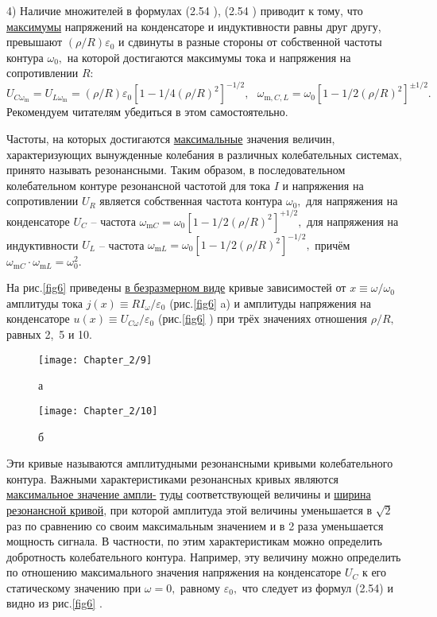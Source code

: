 {4) Наличие множителей   в формулах (2.54 ), (2.54 ) приводит к тому, что \underline{максимумы} напряжений на конденсаторе и индуктивности равны друг другу, превышают $(\rho/R)\varepsilon_0$ и сдви\-нуты в разные стороны от собственной частоты контура $\omega_0,$ на которой достигаются максиму\-мы тока и напряжения на сопротивлении $R:$
{\large
\begin{equation}\label{2.57}
	U_{C\omega_\text{m}}=U_{L\omega_\text{m}}=(\rho/R)\varepsilon_0[1-1/4(\rho/R)^2]^{-1/2},~~~\omega_{\text{m},C,L}=\omega_0[1-1/2(\rho/R)^2]^{\pm1/2}.
\end{equation}}
Рекомендуем читателям убедиться в этом самостоятельно.

Частоты, на которых достигаются \underline{максимальные} значения величин, характеризующих выну\-жденные колебания в различных колебательных системах, принято называть \textsf{резонансными.} Таким образом, в последовательном колебательном контуре резонансной частотой для тока $I$ и напряжения на сопротивлении $U_R$ является собственная частота контура $\omega_0,$ для напряжения на конденсаторе $U_C$ – частота $\omega_{\text{m}C}=\omega_0[1-1/2(\rho/R)^2]^{+1/2},$ для напряжения на индуктивности $U_L$ – частота $\omega_{\text{m}L}=\omega_0[1-1/2(\rho/R)^2]^{-1/2},$ причём $\omega_{\text{m}C}\cdot\omega_{\text{m}L}=\omega_0^2.$
	
На рис.\ref{fig6} приведены \underline{в безразмерном виде} кривые зависимостей от $x\equiv\omega/\omega_0$ амплитуды тока $j(x)\equiv RI_\omega/\varepsilon_0$ (рис.\ref{fig6} a) и амплитуды напряжения на конденсаторе $u(x)\equiv U_{C\omega}/\varepsilon_0$  (рис.\ref{fig6} ) при трёх значениях отношения $\rho/R,$ равных 2,~5 и 10.

\begin{figure}[h]
	\begin{center}
		\begin{minipage}[h]{0.45\linewidth}
			\texttt{[image: Chapter\_2/9]}
			\caption{а} 
			\label{fig6} 
		\end{minipage}
		\hfill
		\setcounter{figure}{5}
		\begin{minipage}[h]{0.45\linewidth}
			\texttt{[image: Chapter\_2/10]}
			\caption{б}
			\label{fig9}
		\end{minipage}
	\end{center}
\end{figure}

Эти кривые называются \textsf{амплитудными резонансными кривыми} колебательного контура. Важ\-ными характеристиками резонансных кривых являются \underline{мак\-си\-маль\-ное значение ам\-пли-} \underline{ту\-ды} соответствующей величины и \underline{ширина ре\-зо\-нанс\-ной кривой}, при которой амплитуда этой величины уменьшается в $\sqrt{2}$ раз по сравнению со своим максимальным значением и в 2 раза уменьшается мощность сигнала. В частности, по этим характеристикам можно определить добротность колебательного контура. Например, эту величину можно определить по отношению максимального значения напряжения на конденсаторе $U_C$ к его статическому значению при $\omega=0,$ равному $\varepsilon_0,$ что следует из формул (2.54) и видно из рис.\ref{fig6} .

}
